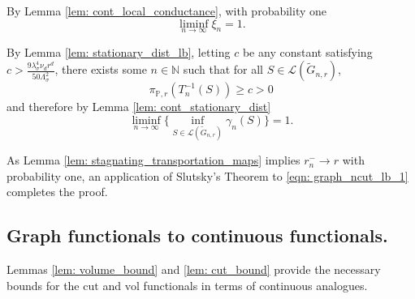 \documentclass{article}
\newcommand{\Naturals}{\mathbb{N}}
\newcommand{\Pbb}{\mathbb{P}}
\newcommand{\1}{\mathbf{1}}
\newcommand{\cut}{\mathrm{cut}}
\newcommand{\vol}{\mathrm{vol}}
\theoremstyle{alden}
\theoremstyle{aldenthm}
\theoremstyle{remark}
\begin{document}
By Lemma \ref{lem: cont_local_conductance}, with probability one
\begin{equation*}
\liminf_{n \to \infty} \xi_n = 1.
\end{equation*}

By Lemma \ref{lem: stationary_dist_lb}, letting $c$ be any constant satisfying $c > \frac{9\lambda_{\sigma}^4 \nu_d r^d}{50\Lambda_{\sigma}^2}$, there exists some $n \in \Naturals$ such that for all $S \in \mathcal{L}(\widetilde{G}_{n,r})$,
\begin{equation*}
\pi_{\Pbb,r}(T_n^{-1}(S)) \geq c > 0
\end{equation*}
and therefore by Lemma \ref{lem: cont_stationary_dist}
\begin{equation*}
\liminf_{n \to \infty} \biggl\{ \inf_{S \in \mathcal{L}(\widetilde{G}_{n,r})} \gamma_n(S)\biggr\} = 1.
\end{equation*}

As Lemma \ref{lem: stagnating_transportation_maps} implies $r_n^{-} \to r$ with probability one, an application of Slutsky's Theorem to \eqref{eqn: graph_ncut_lb_1} completes the proof.

\subsection{Graph functionals to continuous functionals.}

Lemmas \ref{lem: volume_bound} and \ref{lem: cut_bound} provide the necessary bounds for the $\cut$ and $\vol$ functionals in terms of continuous analogues.
\end{document}
